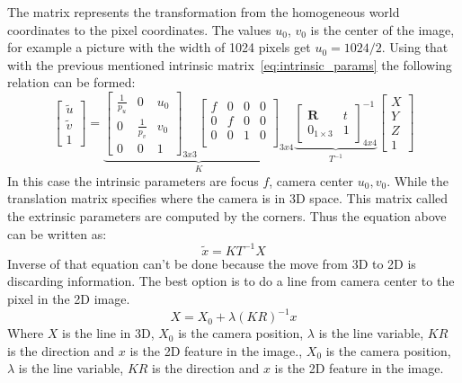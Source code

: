 The matrix represents the transformation from the homogeneous world coordinates to the pixel coordinates.
The values $u_0$, $v_0$ is the center of the image, for example a picture with the width of 1024 pixels get $u_0 = 1024/2$.
Using that with the previous mentioned intrinsic matrix~\ref{eq:intrinsic_params} the following relation can be formed:
\begin{equation}\label{eq:camera_transfer}
    \begin{bmatrix}
        \tilde{u} \\ \tilde{v} \\ 1
    \end{bmatrix} =
    \underbrace{
        \begin{bmatrix}
            \frac{1}{p_u} & 0 & u_0\\
            0 & \frac{1}{p_v} & v_0\\
            0 & 0 & 1
        \end{bmatrix}_{3x3}
        \begin{bmatrix}
            f & 0 & 0 & 0\\
            0 & f & 0 & 0\\
            0 & 0 & 1 & 0\\
        \end{bmatrix}_{3x4}
    }_K
    \underbrace{
        \begin{bmatrix}
            \mathbf{R} & t \\
            0_{1\times 3} & 1
        \end{bmatrix}^{-1}_{4x4}
    }_{T^{-1}}
    \begin{bmatrix}
        X \\ Y \\ Z \\ 1
    \end{bmatrix}
\end{equation}
In this case the intrinsic parameters are focus $f$, camera center $u_0,v_0$.
While the translation matrix specifies where the camera is in 3D space.
This matrix called the extrinsic parameters are computed by the \aruco corners.
Thus the equation above can be written as:
\begin{equation}
    \tilde{x}  = KT^{-1}X
\end{equation}
Inverse of that equation can't be done because the move from 3D to 2D is discarding information.
The best option is to do a line from camera center to the pixel in the 2D image.
\begin{equation}
    X = X_0 + \lambda(KR)^{-1}  x
\end{equation}
Where $X$ is the line in 3D, $X_0$ is the camera position, $\lambda$ is the line variable, $KR$ is the direction and $x$ is the 2D feature in the image., $X_0$ is the camera position, $\lambda$ is the line variable, $KR$ is the direction and $x$ is the 2D feature in the image.


